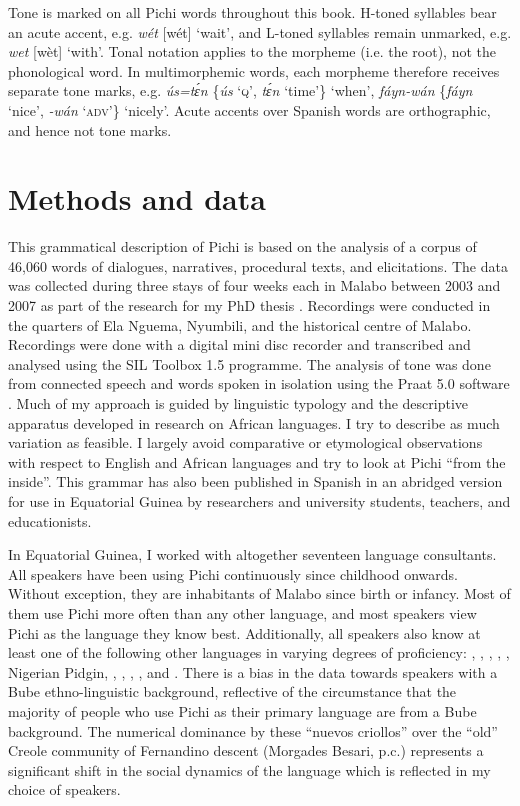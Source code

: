 Tone is marked on all Pichi words throughout this book. H-toned syllables bear an acute accent, e.g. \textit{wét} [wét] ‘wait’, and L-toned syllables remain unmarked, e.g. \textit{wet} [wèt] ‘with’. Tonal notation applies to the morpheme (i.e. the root), not the phonological word. In multimorphemic words, each morpheme therefore receives separate tone marks, e.g. \textit{ús=tɛ́n} \{\textit{\'us} ‘\textsc{q}’, \textit{tɛ́n} ‘time’\} ‘when’, \textit{fáyn-wán} \{\textit{fáyn} ‘nice’, \textit{-wán} ‘\textsc{adv}’\} ‘nicely’. Acute accents over Spanish words are orthographic, and hence not tone marks.


\section{Methods and data}\label{sec:1.7}

This grammatical description of Pichi is based on the analysis of a corpus of 46,060 words of dialogues, narratives, procedural texts, and elicitations. The data was collected during three stays of four weeks each in Malabo between 2003 and 2007 as part of the research for my PhD thesis \citep{Yakpo2009a}. Recordings were conducted in the quarters of Ela Nguema, Nyumbili, and the historical centre of Malabo. Recordings were done with a digital mini disc recorder and transcribed and analysed using the SIL Toolbox 1.5 programme. The analysis of tone was done from connected speech and words spoken in isolation using the Praat 5.0 software \citep{boersma2008}. Much of my approach is guided by linguistic typology and the descriptive apparatus developed in research on African languages. I try to describe as much variation as feasible. I largely avoid comparative or etymological observations with respect to English and African languages and try to look at Pichi “from the inside”. This grammar has also been published in Spanish \citep{Yakpo2010} in an abridged version for use in Equatorial Guinea by researchers and university students, teachers, and educationists. 


In Equatorial Guinea, I worked with altogether seventeen language consultants. All speakers have been using Pichi continuously since childhood onwards. Without exception, they are inhabitants of Malabo since birth or infancy. Most of them use Pichi more often than any other language, and most speakers view Pichi as the language they know best. Additionally, all speakers also know at least one of the following other languages in varying degrees of proficiency: , , , , , Nigerian Pidgin, , , , , and . There is a bias in the data towards speakers with a Bube ethno-linguistic background, reflective of the circumstance that the majority of people who use Pichi as their primary language are from a Bube background. The numerical dominance by these “nuevos criollos” over the “old” Creole community of Fernandino descent (Morgades Besari, p.c.) represents a significant shift in the social dynamics of the language which is reflected in my choice of speakers. 



